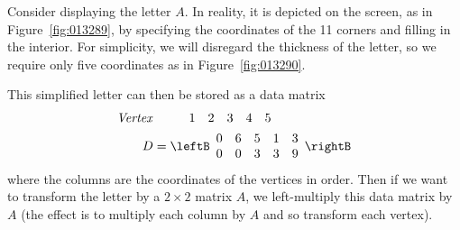 \begin{figure}[H]
\centering
\begin{minipage}{0.15\textwidth}
\centering

\caption{\label{fig:013289}}
\end{minipage}
\hspace*{1em}
\begin{minipage}{0.15\textwidth}
\centering

\caption{\label{fig:013290}}
\end{minipage}
\hspace*{1em}
\begin{minipage}{0.15\textwidth}
\centering

\caption{\label{fig:013296}}
\end{minipage}
\hspace*{1em}
\begin{minipage}{0.15\textwidth}
\centering

\caption{\label{fig:013297}}
\end{minipage}
\hspace*{1em}
\begin{minipage}{0.15\textwidth}
\centering

\caption{\label{fig:013303}}
\end{minipage}
\end{figure}


Consider displaying the letter $A$. In reality, it is depicted on the screen, as in Figure~\ref{fig:013289},
 by specifying the coordinates of the 11 corners and filling in the 
interior.  For simplicity, we will disregard the thickness of the letter, so we require only five coordinates as in Figure~\ref{fig:013290}. 

This simplified letter can then be stored as a data matrix
\begin{align*}
\mbox{\textit{Vertex}} & 
\ \ \ \ \ \ \ \begin{array}{rrrrr}
1 & 2 & 3 & 4 & 5
\end{array} \\
D &= \leftB
\begin{array}{rrrrr}
0 & 6 & 5 & 1 & 3\\
0 & 0 & 3 & 3 & 9
\end{array}
\rightB
\end{align*}
where the columns are the coordinates of the vertices in order. Then if we want to transform the letter by a $2 \times 2$ matrix $A$, we left-multiply this data matrix by $A$ (the effect is to multiply each column by $A$ and so transform each vertex).

